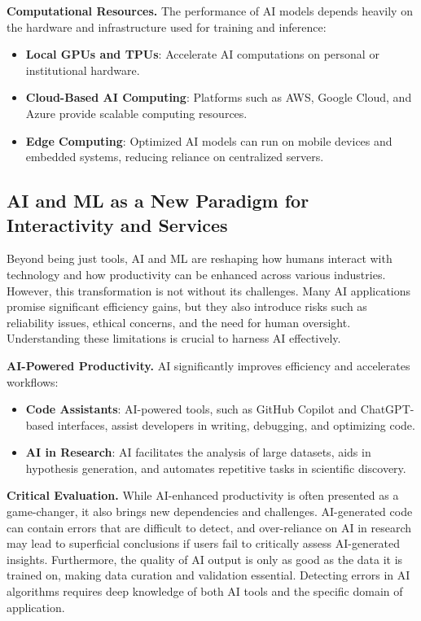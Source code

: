 \textbf{Computational Resources.} The performance of AI models depends heavily on the hardware and infrastructure used for training and inference:
\begin{itemize}
    \item \textbf{Local GPUs and TPUs}: Accelerate AI computations on personal or institutional hardware.
    \item \textbf{Cloud-Based AI Computing}: Platforms such as AWS, Google Cloud, and Azure provide scalable computing resources.
    \item \textbf{Edge Computing}: Optimized AI models can run on mobile devices and embedded systems, reducing reliance on centralized servers.
\end{itemize}

\subsection{AI and ML as a New Paradigm for Interactivity and Services}

Beyond being just tools, AI and ML are reshaping how humans interact with technology and how productivity can be enhanced across various industries. However, this transformation is not without its challenges. Many AI applications promise significant efficiency gains, but they also introduce risks such as reliability issues, ethical concerns, and the need for human oversight. Understanding these limitations is crucial to harness AI effectively.

\textbf{AI-Powered Productivity.} AI significantly improves efficiency and accelerates workflows:
\begin{itemize}
    \item \textbf{Code Assistants}: AI-powered tools, such as GitHub Copilot and ChatGPT-based interfaces, assist developers in writing, debugging, and optimizing code.
    \item \textbf{AI in Research}: AI facilitates the analysis of large datasets, aids in hypothesis generation, and automates repetitive tasks in scientific discovery.
\end{itemize}

\textbf{Critical Evaluation.} While AI-enhanced productivity is often presented as a game-changer, it also brings new dependencies and challenges. AI-generated code can contain errors that are difficult to detect, and over-reliance on AI in research may lead to superficial conclusions if users fail to critically assess AI-generated insights. Furthermore, the quality of AI output is only as good as the data it is trained on, making data curation and validation essential. Detecting errors in AI algorithms requires deep knowledge of both AI tools and the specific domain of application.

